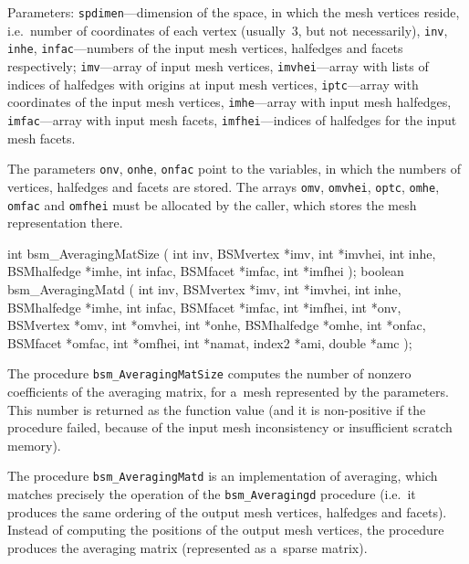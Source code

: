 Parameters: \texttt{spdimen}---dimension of the space, in which the mesh
vertices reside, i.e.\ number of coordinates of each vertex (usually~$3$,
but not necessarily), \texttt{inv}, \texttt{inhe}, \texttt{infac}---numbers of
the input mesh vertices, halfedges and facets respectively;
\texttt{imv}---array of input mesh vertices, \texttt{imvhei}---array with
lists of indices of halfedges with origins at input mesh vertices,
\texttt{iptc}---array with coordinates of the input mesh vertices,
\texttt{imhe}---array with input mesh halfedges, \texttt{imfac}---array with
input mesh facets, \texttt{imfhei}---indices of halfedges for the input mesh
facets.

The parameters \texttt{onv}, \texttt{onhe}, \texttt{onfac} point to the
variables, in which the numbers of vertices, halfedges and facets are
stored. The arrays \texttt{omv}, \texttt{omvhei}, \texttt{optc},
\texttt{omhe}, \texttt{omfac} and \texttt{omfhei} must be allocated by the
caller, which stores the mesh representation there.

\medskip
\begin{listingC}
int bsm_AveragingMatSize ( int inv, BSMvertex *imv, int *imvhei,
                           int inhe, BSMhalfedge *imhe,
                           int infac, BSMfacet *imfac, int *imfhei );
boolean bsm_AveragingMatd ( int inv, BSMvertex *imv, int *imvhei,
                            int inhe, BSMhalfedge *imhe,
                            int infac, BSMfacet *imfac, int *imfhei,
                            int *onv, BSMvertex *omv, int *omvhei,  
                            int *onhe, BSMhalfedge *omhe,
                            int *onfac, BSMfacet *omfac, int *omfhei,
                            int *namat, index2 *ami, double *amc );  
\end{listingC}
The procedure \texttt{bsm\_AveragingMatSize} computes the number of nonzero
coefficients of the averaging matrix, for a~mesh represented by the
parameters. This number is returned as the function value (and it is
non-positive if the procedure failed, because of the input mesh
inconsistency or insufficient scratch memory).

The procedure \texttt{bsm\_AveragingMatd} is an implementation of averaging,
which matches precisely the operation of the \texttt{bsm\_Averagingd}
procedure (i.e.\ it produces the same ordering of the output mesh vertices,
halfedges and facets). Instead of computing the positions of the output mesh
vertices, the procedure produces the averaging matrix (represented as
a~sparse matrix).

